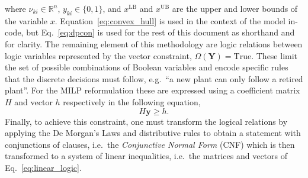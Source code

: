 \documentclass{amsart}
\begin{document}
%
where $\nu_{ki} \in \mathbb{R}^n$, $y_{ki}\in \{0,1\}$, and $x^{\text{LB}}$ and 
$x^{\text{UB}}$ are the upper and lower bounds of the variable $x$.
Equation~\eqref{eq:convex_hull} is used in the context of the model in-code, but
Eq.~\eqref{eq:dpcon} is used for the rest of this document as shorthand and for
clarity.
%
The remaining element of this methodology are logic relations between logic
variables represented by the vector constraint, $\Omega \left(\bm{Y}\right) =
\text{True}$. These limit the set of possible combinations of Boolean variables
and encode specific rules that the discrete decisions must follow, e.g.\ ``a new
plant can only follow a retired plant''. For the MILP reformulation these are
expressed using a coefficient matrix $H$ and vector $h$ respectively in the
following equation,
%
\begin{equation}\label{eq:linear_logic}
    H \bm{y} \geq h.
\end{equation}
%
Finally, to achieve this constraint, one must transform the logical relations
by applying the De Morgan's Laws and distributive rules to obtain a
statement with conjunctions of clauses, i.e.\ the \emph{Conjunctive Normal Form}
(CNF) which is then transformed to a system of linear inequalities, i.e.\ the
matrices and vectors of Eq.~\eqref{eq:linear_logic}.
%
\end{document}
